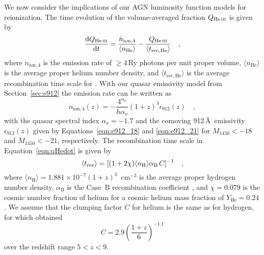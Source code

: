 \documentclass[fleqn,usenatbib]{mnras}
\def\HeII{\hbox{He~$\scriptstyle\rm II$}}
\begin{document}
We now consider the implications of our AGN luminosity function models
for  reionization. The time evolution of the
volume-averaged  fraction $Q_\ion{He}{iii}$ is given by
\citep[e.g.][]{2012ApJ...746..125H}
\begin{equation}
  \frac{\mathrm{d}Q_\ion{He}{iii}}{\mathrm{d}t}=\frac{\dot{n}_\mathrm{ion,4}}{\langle n_\mathrm{He}\rangle}-\frac{Q_\ion{He}{iii}}{\langle t_\mathrm{rec,He}\rangle}\quad,
  \label{eqn:qHedot}
\end{equation}
where $\dot n_\mathrm{ion,4}$ is the emission rate of $\ge 4$\,Ry photons per unit proper volume,
$\langle n_\mathrm{He}\rangle$ is the average proper helium number density,
and $\langle t_\mathrm{rec,He}\rangle$ is the average recombination time scale for .
With our quasar emissivity model from Section~\ref{sec:e912} the emission rate
can be written as
\begin{equation}
\dot n_\mathrm{ion,4}\left(z\right)=-\frac{4^{\alpha_\nu}}{h\alpha_\nu}\left(1+z\right)^3\epsilon_{912}\left(z\right)\quad,
\end{equation}
with the quasar spectral index $\alpha_\nu=-1.7$ and the comoving 912\,\AA\ emissivity
$\epsilon_{912}\left(z\right)$ given by Equations~\eqref{eqn:e912_18} and \eqref{eqn:e912_21}
for $M_{1450}<-18$ and $M_{1450}<-21$, respectively.
The recombination time scale in Equation~\eqref{eqn:qHedot} is given by
\begin{equation}
  \langle t_{\rm rec}\rangle=[(1+2\chi) \langle n_\mathrm{H}\rangle \alpha_\mathrm{B}\,C]^{-1}\quad,
  \label{eq:trec}
\end{equation}
where $\langle n_\mathrm{H}\rangle=1.881\times
10^{-7}(1+z)^3$~cm$^{-3}$ is the average proper hydrogen number density,
$\alpha_\mathrm{B}$ is the Case~B  recombination coefficient \citep{1997MNRAS.292...27H},
and $\chi=0.079$ is the cosmic number fraction of helium for a cosmic
helium mass fraction of $Y_\mathrm{He}=0.24$. 
We assume that the clumping factor $C$ for helium is the same as for hydrogen,
for which \citet{2012ApJ...747..100S} obtained
\begin{equation}
  C = 2.9\left(\frac{1+z}{6}\right)^{-1.1}
\end{equation}
over the redshift range $5<z<9$. 
\end{document}
